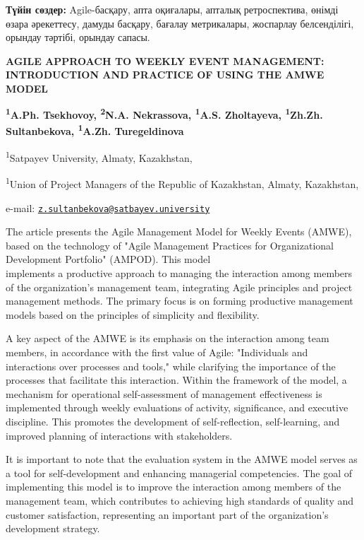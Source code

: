 {\bfseries Түйін сөздер:} Agile-басқару, апта оқиғалары, апталық
ретроспектива, өнімді өзара әрекеттесу, дамуды басқару, бағалау
метрикалары, жоспарлау белсенділігі, орындау тәртібі, орындау сапасы.

\begin{articleheader}
{\bfseries AGILE APPROACH TO WEEKLY EVENT MANAGEMENT: INTRODUCTION AND
PRACTICE OF USING THE AMWE MODEL}

{\bfseries \textsuperscript{1}A.Ph. Tsekhovoy, \textsuperscript{2}N.A.
Nekrassova, \textsuperscript{1}A.S. Zholtayeva,
\textsuperscript{1}Zh.Zh. Sultanbekova\textsuperscript{\envelope }, \textsuperscript{1}A.Zh. Turegeldinova}
\end{articleheader}
\begin{affiliation}

\textsuperscript{1}Satpayev University, Almaty, Kazakhstan,

\textsuperscript{1}Union of Project Managers of the Republic of
Kazakhstan, Almaty, Kazakhstan,

e-mail:
\href{mailto:z.sultanbekova@satbayev.university}{\nolinkurl{z.sultanbekova@satbayev.university}}
\end{affiliation}

The article presents the Agile Management Model for Weekly Events
(AMWE), based on the technology of "Agile Management Practices for
Organizational Development Portfolio" (AMPOD). This model \\implements a
productive approach to managing the interaction among members of the
organization's management team, integrating Agile principles and project
management methods. The primary focus is on forming productive
management models based on the principles of simplicity and flexibility.

A key aspect of the AMWE is its emphasis on the interaction among team
members, in accordance with the first value of Agile: "Individuals and
interactions over processes and tools," while clarifying the importance
of the processes that facilitate this interaction. Within the framework
of the model, a mechanism for operational self-assessment of management
effectiveness is implemented through weekly evaluations of activity,
significance, and executive discipline. This promotes the development of
self-reflection, self-learning, and improved planning of interactions
with stakeholders.

It is important to note that the evaluation system in the AMWE model
serves as a tool for self-development and enhancing managerial
competencies. The goal of implementing this model is to improve the
interaction among members of the management team, which contributes to
achieving high standards of quality and customer satisfaction,
representing an important part of the organization's development
strategy.

